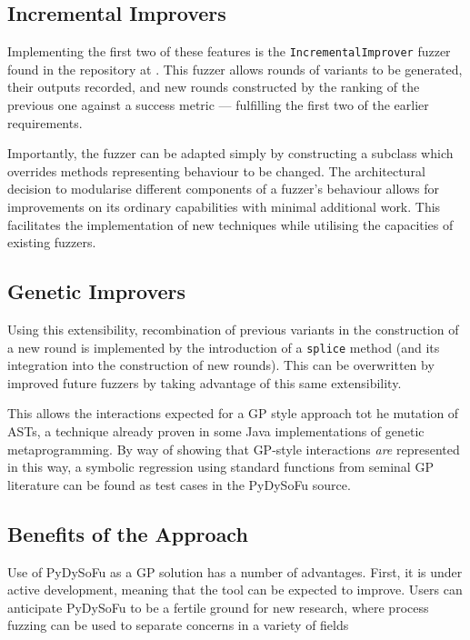 \documentclass[draft,12pt]{llncs}   %
\begin{document}
\subsection{Incremental Improvers}
Implementing the first two of these features is the \texttt{IncrementalImprover}
fuzzer found in the repository at \cite{pydysofu}. This fuzzer allows rounds of
variants to be generated, their outputs recorded, and new rounds constructed by
the ranking of the previous one against a success metric --- fulfilling the
first two of the earlier requirements.\par

Importantly, the fuzzer can be adapted simply by constructing a subclass which
overrides methods representing behaviour to be changed. The architectural
decision to modularise different components of a fuzzer's behaviour allows for
improvements on its ordinary capabilities with minimal additional work. This
facilitates the implementation of new techniques while utilising the capacities
of existing fuzzers.\par

\subsection{Genetic Improvers}

Using this extensibility, recombination of previous variants in the construction
of a new round is implemented by the introduction of a \texttt{splice} method
(and its integration into the construction of new rounds). This can be
overwritten by improved future fuzzers by taking advantage of this same
extensibility.\par

This allows the interactions expected for a GP style approach tot he mutation of
ASTs, a technique already proven in some Java implementations of genetic
metaprogramming\cite{castle2012evolving,cody2015locogp}. By way of showing that
GP-style interactions \emph{are} represented in this way, a symbolic regression
using standard functions from seminal GP literature\cite{koza1994genetic} can be
found as test cases in the PyDySoFu source\cite{pydysofu}.\par

\subsection{Benefits of the Approach}
Use of PyDySoFu as a GP solution has a number of advantages. First, it is under
active development, meaning that the tool can be expected to improve. Users can
anticipate PyDySoFu to be a fertile ground for new research, where process
fuzzing can be used to separate concerns in a variety of fields\par
\end{document}
